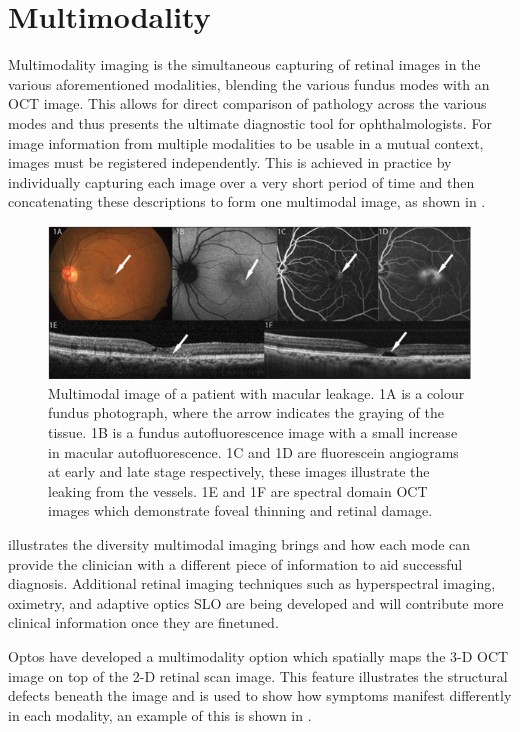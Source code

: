 \section{Multimodality}

Multimodality imaging is the simultaneous capturing of retinal images in the various
aforementioned modalities, blending the various fundus modes with an OCT image.
\cite{abramoff2010retinal} This allows for direct comparison of pathology across
the various modes and thus presents the ultimate diagnostic tool for ophthalmologists.
For image information from multiple modalities to be usable in a mutual context,
images must be registered independently. This is achieved in practice by individually
capturing each image over a very short period of time and then concatenating these
descriptions to form one multimodal image, as shown in .

\begin{figure}[htbp]
\centering
\includegraphics{figures/multitwo}
\caption{Multimodal image of a patient with macular leakage. 1A is a colour fundus
photograph, where the arrow indicates the graying of the tissue. 1B is a fundus
autofluorescence image with a small increase in macular autofluorescence. 1C and 1D
are fluorescein angiograms at early and late stage respectively, these images illustrate
the leaking from the vessels. 1E and 1F are spectral domain OCT images which demonstrate
foveal thinning and retinal damage.}
\label{fig:mt}
\end{figure}

 illustrates the diversity multimodal imaging brings and how each mode
can provide the clinician with a different piece of information to aid successful
diagnosis. Additional retinal imaging techniques such as hyperspectral imaging,
oximetry, and adaptive optics SLO are being developed and will contribute more
clinical information once they are finetuned.

Optos have developed a multimodality option which spatially maps the 3-D OCT
image on top of the 2-D retinal scan image. This feature illustrates the structural
defects beneath the image and is used to show how symptoms manifest differently in
each modality, an example of this is shown in .

